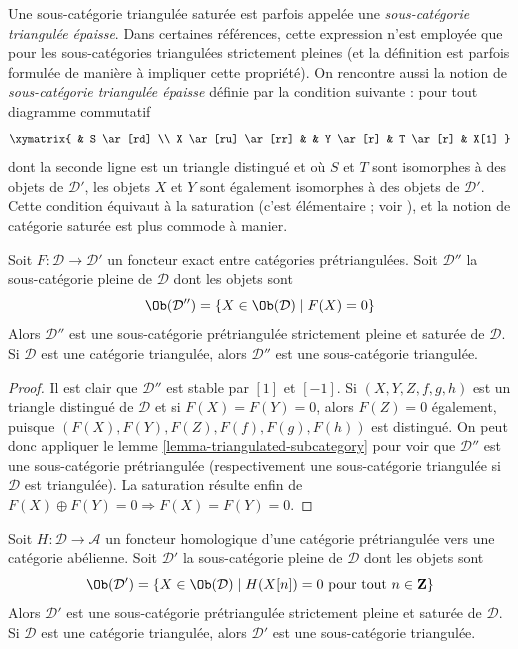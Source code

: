 \noindent
Une sous-catégorie triangulée saturée est parfois appelée une
{\it sous-catégorie triangulée épaisse}. Dans certaines références, cette
expression n'est employée que pour les sous-catégories triangulées strictement
pleines (et la définition est parfois formulée de manière à impliquer cette
propriété). On rencontre aussi la notion de {\it sous-catégorie triangulée
épaisse} définie par la condition suivante : pour tout diagramme commutatif
$$
\xymatrix{
& S \ar[rd] \\
X \ar[ru] \ar[rr] & & Y \ar[r] & T \ar[r] & X[1]
}
$$
dont la seconde ligne est un triangle distingué et où $S$ et $T$ sont
isomorphes à des objets de $\mathcal{D}'$, les objets $X$ et $Y$ sont également
isomorphes à des objets de $\mathcal{D}'$. Cette condition équivaut à la
saturation (c'est élémentaire ; voir \cite{Rickard-derived}), et la notion de
catégorie saturée est plus commode à manier.

\begin{lemma}
\label{lemma-triangle-functor-kernel}
Soit $F : \mathcal{D} \to \mathcal{D}'$ un foncteur exact entre catégories
prétriangulées. Soit $\mathcal{D}''$ la sous-catégorie pleine de $\mathcal{D}$
dont les objets sont
$$
\Ob(\mathcal{D}'') =
\{X \in \Ob(\mathcal{D}) \mid F(X) = 0\}
$$
Alors $\mathcal{D}''$ est une sous-catégorie prétriangulée strictement pleine
et saturée de $\mathcal{D}$. Si $\mathcal{D}$ est une catégorie triangulée,
alors $\mathcal{D}''$ est une sous-catégorie triangulée.
\end{lemma}

\begin{proof}
Il est clair que $\mathcal{D}''$ est stable par $[1]$ et $[-1]$.
Si $(X, Y, Z, f, g, h)$ est un triangle distingué de $\mathcal{D}$ et si
$F(X) = F(Y) = 0$, alors $F(Z) = 0$ également, puisque
$(F(X), F(Y), F(Z), F(f), F(g), F(h))$ est distingué.
On peut donc appliquer le lemme \ref{lemma-triangulated-subcategory} pour voir
que $\mathcal{D}''$ est une sous-catégorie prétriangulée (respectivement une
sous-catégorie triangulée si $\mathcal{D}$ est triangulée).
La saturation résulte enfin de
$F(X) \oplus F(Y) = 0 \Rightarrow F(X) = F(Y) = 0$.
\end{proof}

\begin{lemma}
\label{lemma-homological-functor-kernel}
Soit $H : \mathcal{D} \to \mathcal{A}$ un foncteur homologique d'une catégorie
prétriangulée vers une catégorie abélienne.
Soit $\mathcal{D}'$ la sous-catégorie pleine de $\mathcal{D}$ dont les objets
sont
$$
\Ob(\mathcal{D}') =
\{X \in \Ob(\mathcal{D}) \mid
H(X[n]) = 0\text{ pour tout }n \in \mathbf{Z}\}
$$
Alors $\mathcal{D}'$ est une sous-catégorie prétriangulée strictement pleine et
saturée de $\mathcal{D}$. Si $\mathcal{D}$ est une catégorie triangulée, alors
$\mathcal{D}'$ est une sous-catégorie triangulée.
\end{lemma}

